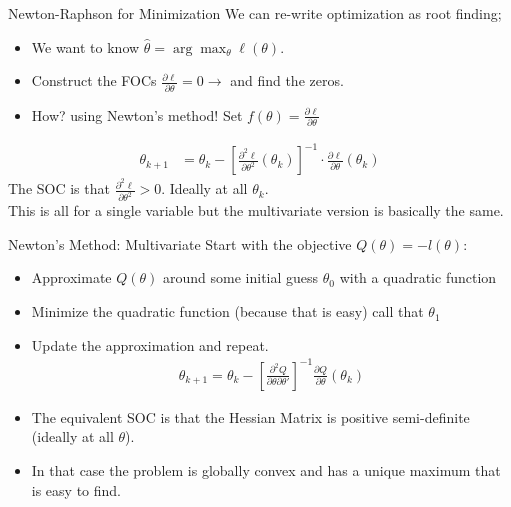 \begin{frame}{Newton-Raphson for Minimization}
We can re-write \alert{optimization} as \alert{root finding};
\begin{itemize}
\item We want to know $\hat{\theta} = \arg \max_{\theta} \ell(\theta)$.
\item Construct the FOCs $\frac{\partial \ell}{\partial \theta}=0 \rightarrow$  and find the zeros.
\item How? using Newton's method! Set $f(\theta) = \frac{\partial \ell}{\partial \theta}$
\end{itemize}
\begin{align*}
\theta_{k+1} &= \theta_k -  \left[ \frac{\partial^2 \ell}{\partial \theta^2}(\theta_k) \right]^{-1} \cdot \frac{\partial \ell}{\partial \theta}(\theta_k)
\end{align*}
The SOC is that $ \frac{\partial^2 \ell}{\partial \theta^2} >0$. Ideally at all $\theta_k$.\\
This is all for a \alert{single variable} but the \alert{multivariate} version is basically the same.
\end{frame}


\begin{frame}{Newton's Method: Multivariate}
Start with the objective $Q(\theta) = - l(\theta)$:
\begin{itemize}
\item Approximate $Q(\theta)$ around some initial guess $\theta_0$ with a quadratic function
\item Minimize the quadratic function (because that is easy) call that $\theta_1$
\item Update the approximation and repeat.
\begin{align*}
\theta_{k+1} = \theta_k - \left[ \frac{\partial^2 Q}{\partial \theta \partial \theta'} \right]^{-1}\frac{\partial Q}{\partial \theta}(\theta_k)
\end{align*}
\item The equivalent SOC is that the {Hessian Matrix} is \alert{positive semi-definite}  (ideally at all $\theta$).
\item In that case the problem is \alert{globally convex} and has a \alert{unique maximum} that is easy to find.
\end{itemize}
\end{frame}


